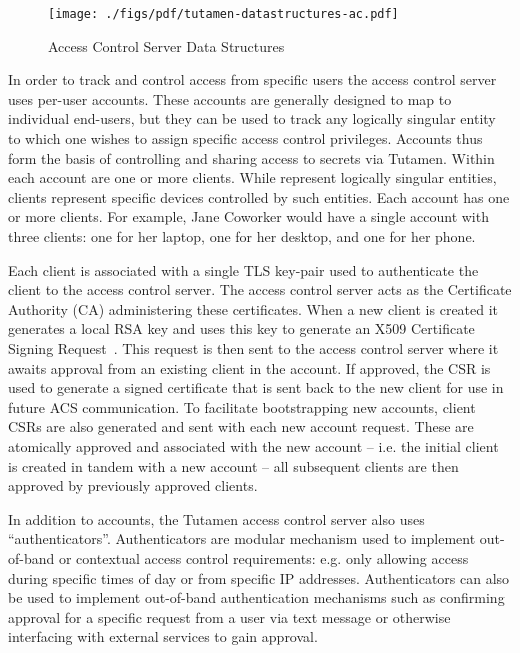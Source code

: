 \begin{figure}[th]
  \centering
  \texttt{[image: ./figs/pdf/tutamen-datastructures-ac.pdf]}
  \caption{Access Control Server Data Structures}
  \label{fig:tutamen:acstructs}
\end{figure}

In order to track and control access from specific users the access
control server uses per-user accounts. These accounts are generally
designed to map to individual end-users, but they can be used to track
any logically singular entity to which one wishes to assign specific
access control privileges. Accounts thus form the basis of controlling
and sharing access to secrets via Tutamen. Within each account are one
or more clients. While represent logically singular entities, clients
represent specific devices controlled by such entities. Each account
has one or more clients. For example, Jane Coworker would have a
single account with three clients: one for her laptop, one for her
desktop, and one for her phone.

Each client is associated with a single TLS key-pair used to
authenticate the client to the access control server. The access
control server acts as the Certificate Authority (CA) administering
these certificates. When a new client is created it generates a local
RSA key and uses this key to generate an X509 Certificate Signing
Request~\cite{rfc5280}. This request is then sent to the access
control server where it awaits approval from an existing client in the
account. If approved, the CSR is used to generate a signed certificate
that is sent back to the new client for use in future ACS
communication. To facilitate bootstrapping new accounts, client CSRs
are also generated and sent with each new account request. These are
atomically approved and associated with the new account -- i.e. the
initial client is created in tandem with a new account -- all
subsequent clients are then approved by previously approved clients.

In addition to accounts, the Tutamen access control server also uses
``authenticators''. Authenticators are modular mechanism used to
implement out-of-band or contextual access control requirements:
e.g. only allowing access during specific times of day or from
specific IP addresses. Authenticators can also be used to implement
out-of-band authentication mechanisms such as confirming approval for
a specific request from a user via text message or otherwise
interfacing with external services to gain approval.


